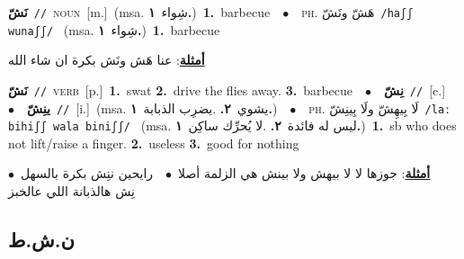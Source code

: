 \documentclass[10pt,a4paper,twoside]{article} %
\begin{document}
\begin{multicols}{2}
{\setlength\topsep{0pt}\textbf{\foreignlanguage{arabic}{نَشّ}}\ {\color{gray}\texttt{//}\color{black}}\ \textsc{noun}\ [m.]\ \color{gray}(msa. \foreignlanguage{arabic}{شِواء}~\foreignlanguage{arabic}{\textbf{١.}})\color{black}\ \textbf{1.}~barbecue\ \ $\bullet$\ \ \textsc{ph.} \color{gray} \foreignlanguage{arabic}{هَشّ ونَشّ}\color{black}\ {\color{gray}\texttt{/{\sffamily haʃʃ wunaʃʃ}/}\color{black}}\ \color{gray} (msa. \foreignlanguage{arabic}{شِواء}~\foreignlanguage{arabic}{\textbf{١.}})\color{black}\ \textbf{1.}~barbecue\  \begin{flushright}\color{gray}\foreignlanguage{arabic}{\textbf{\underline{\foreignlanguage{arabic}{أمثلة}}}: عنا هَش ونَش بكرة ان شاء الله}\end{flushright}\color{black}} \vspace{2mm}

{\setlength\topsep{0pt}\textbf{\foreignlanguage{arabic}{نَشّ}}\ {\color{gray}\texttt{//}\color{black}}\ \textsc{verb}\ [p.]\ \textbf{1.}~swat  \textbf{2.}~drive the flies away.  \textbf{3.}~barbecue\ \ $\bullet$\ \ \setlength\topsep{0pt}\textbf{\foreignlanguage{arabic}{نِشّ}}\ {\color{gray}\texttt{//}\color{black}}\ [c.]\ \ $\bullet$\ \ \setlength\topsep{0pt}\textbf{\foreignlanguage{arabic}{ينِشّ}}\ {\color{gray}\texttt{//}\color{black}}\ [i.]\ \color{gray}(msa. \foreignlanguage{arabic}{يشوي}~\foreignlanguage{arabic}{\textbf{٢.}}  .\foreignlanguage{arabic}{يضرِب الذبابة}~\foreignlanguage{arabic}{\textbf{١.}})\color{black}\ \ $\bullet$\ \ \textsc{ph.} \color{gray} \foreignlanguage{arabic}{لَا بِيهِشّ ولَا بِينِشّ}\color{black}\ {\color{gray}\texttt{/{\sffamily laː bihiʃʃ wala biniʃʃ}/}\color{black}}\ \color{gray} (msa. \foreignlanguage{arabic}{ليس له فائدة}~\foreignlanguage{arabic}{\textbf{٢.}}  .\foreignlanguage{arabic}{لا يُحرِّك ساكِن}~\foreignlanguage{arabic}{\textbf{١.}})\color{black}\ \textbf{1.}~sb who does not lift/raise a finger.  \textbf{2.}~useless  \textbf{3.}~good for nothing\  \begin{flushright}\color{gray}\foreignlanguage{arabic}{\textbf{\underline{\foreignlanguage{arabic}{أمثلة}}}: جوزها لا لا بيهش ولا بينش هي الزلمة أصلا\ $\bullet$\ \  رايحين ننِش بكرة بالسهل\ $\bullet$\ \  نِش هالذبانة اللي عالخبز}\end{flushright}\color{black}} \vspace{2mm}

\vspace{-3mm}
\subsection*{\color{blue}\foreignlanguage{arabic}{ن.ش.ط}\color{blue}{}} 


\end{multicols}
\end{document}
